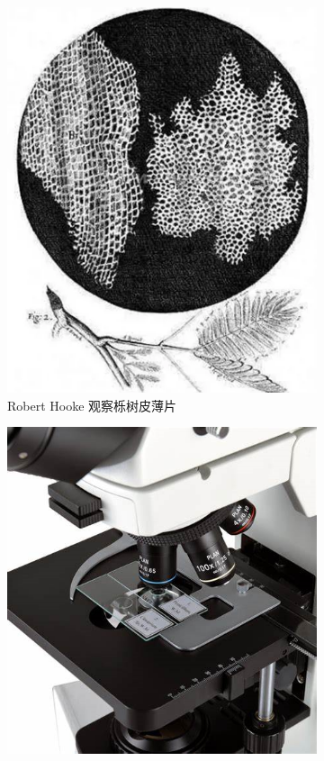 \documentclass[zihao=-4]{ctexart}
\begin{document}
\begin{spacing}{1.5}
\begin{figure}[htbp]
\begin{subfigure}{0.31\textwidth}
							\includegraphics[width=\linewidth]{fig2.png}
							\caption{Robert Hooke 观察栎树皮薄片}
						\end{subfigure}
					\hspace*{\fill}   %
					\begin{subfigure}{0.31\textwidth}
							\includegraphics[width=\linewidth]{fig3.png}

\end{subfigure}
\end{figure}
\end{spacing}
\end{document}
